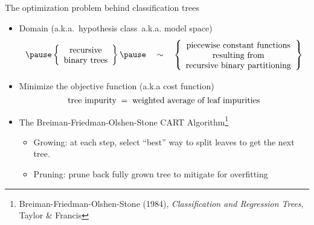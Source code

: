 

\begin{frame}{\vskip -0.2cm \large The optimization problem behind classification trees}


\large
\begin{itemize}
\item
	\pause
	Domain ({\small a.k.a.} \,hypothesis class\, {\small a.k.a.} model space)
	\vskip -0.1cm
	{\scriptsize\begin{equation*}
	\pause
	\left\{\begin{array}{c}
		\overset{{\color{white}.}}{\textnormal{recursive}} \\
		\textnormal{binary trees}
	\end{array}\right\}
	\pause
	\quad\sim\quad
	\left\{\begin{array}{c}
		\overset{{\color{white}.}}{\textnormal{piecewise constant functions}} \\
		\textnormal{resulting from} \\
		\textnormal{recursive binary partitioning}
	\end{array}\right\}
	\end{equation*}}

\item
	\pause
	Minimize the objective function ({\small a.k.a} cost function)
	\pause
	\vskip -0.1cm
	{\small\begin{equation*}
	\textnormal{tree impurity}
	\;=\;
		\textnormal{weighted average of leaf impurities}
	\end{equation*}}

\item
	\pause
	\vskip -0.2cm
	The Breiman-Friedman-Olshen-Stone CART
	Algorithm\!\!\footnote{\tiny Breiman-Friedman-Olshen-Stone (1984),
	\textit{{\color{red}C}lassification {\color{red}a}nd {\color{red}R}egression {\color{red}T}rees},
	Taylor \& Francis}
	\begin{itemize}
	\setlength{\itemindent}{-0.175in}
	\item
		\pause
		{\footnotesize Growing: at each step, select ``best'' way to split leaves to get the next tree.}
	\item
		\pause
		{\footnotesize Pruning: prune back fully grown tree to mitigate for overfitting}
	\end{itemize}
\end{itemize}

\end{frame}
\normalsize

